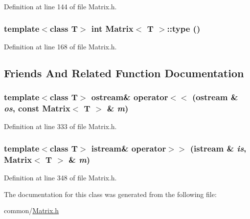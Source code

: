 Definition at line 144 of file Matrix.h.

\hypertarget{classMatrix_af4fd573f5a962ec6c893051785f42480}{
\subsubsection[{type}]{\setlength{\rightskip}{0pt plus 5cm}template$<$class T$>$ int {\bf Matrix}$<$ T $>$::type ()}}
\label{classMatrix_af4fd573f5a962ec6c893051785f42480}


Definition at line 168 of file Matrix.h.



\subsection{Friends And Related Function Documentation}
\hypertarget{classMatrix_a5ed9a90fd6f010e7e9840a17d92d5361}{
\subsubsection[{operator$<$$<$}]{\setlength{\rightskip}{0pt plus 5cm}template$<$class T$>$ ostream\& operator$<$$<$ (ostream \& {\em os}, \/  const {\bf Matrix}$<$ T $>$ \& {\em m})}}
\label{classMatrix_a5ed9a90fd6f010e7e9840a17d92d5361}


Definition at line 333 of file Matrix.h.

\hypertarget{classMatrix_afcea9fa7d9a5052070fe1fda963ef237}{
\subsubsection[{operator$>$$>$}]{\setlength{\rightskip}{0pt plus 5cm}template$<$class T$>$ istream\& operator$>$$>$ (istream \& {\em is}, \/  {\bf Matrix}$<$ T $>$ \& {\em m})}}
\label{classMatrix_afcea9fa7d9a5052070fe1fda963ef237}


Definition at line 348 of file Matrix.h.



The documentation for this class was generated from the following file:\begin{DoxyCompactItemize}
\item 
common/\hyperlink{Matrix_8h}{Matrix.h}\end{DoxyCompactItemize}
